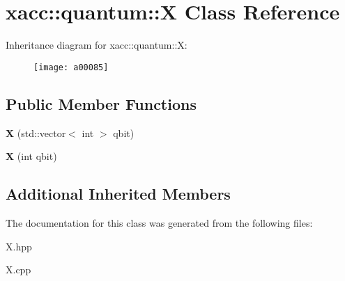 \hypertarget{a00085}{}\section{xacc\+:\+:quantum\+:\+:X Class Reference}
\label{a00085}
Inheritance diagram for xacc\+:\+:quantum\+:\+:X\+:\begin{figure}[H]
\begin{center}
\leavevmode
\texttt{[image: a00085]}
\end{center}
\end{figure}
\subsection*{Public Member Functions}
\begin{DoxyCompactItemize}
\item 
{\bfseries X} (std\+::vector$<$ int $>$ qbit)\hypertarget{a00085_aedc541a302602154847118f73b040510}{}\label{a00085_aedc541a302602154847118f73b040510}

\item 
{\bfseries X} (int qbit)\hypertarget{a00085_a1159bd01929b59277b4524ccfcfd7440}{}\label{a00085_a1159bd01929b59277b4524ccfcfd7440}

\end{DoxyCompactItemize}
\subsection*{Additional Inherited Members}


The documentation for this class was generated from the following files\+:\begin{DoxyCompactItemize}
\item 
X.\+hpp\item 
X.\+cpp\end{DoxyCompactItemize}
